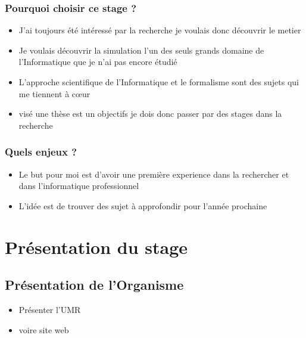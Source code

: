 \documentclass{rapport_stage}
\begin{document}
\section*{Pourquoi choisir ce stage ?}

\begin{itemize}[label=$\bullet$]
  \item J'ai toujours été intéressé par la recherche je voulais donc découvrir le metier
  \item Je voulais découvrir la simulation l'un des seuls grands domaine de l'Informatique que je n'ai pas encore étudié
  \item L'approche scientifique de l'Informatique et le formalisme sont des sujets qui me tiennent à cœur
  \item visé une thèse est un objectifs je dois donc passer par des stages dans la recherche
\end{itemize}

\section*{Quels enjeux ?}

\begin{itemize}[label=$\bullet$]
  \item Le but pour moi est d'avoir une première experience dans la rechercher et dans l'informatique professionnel
  \item L'idée est de trouver des sujet à approfondir pour l'année prochaine
\end{itemize}

\cleardoublepage





\part{Présentation du stage}

\chapter{Présentation de l'Organisme}

\begin{itemize}[label=$\bullet$]
  \item Présenter l'UMR \cite{santoni_presentation_2022}
  \item voire site web
\end{itemize}
\end{document}
